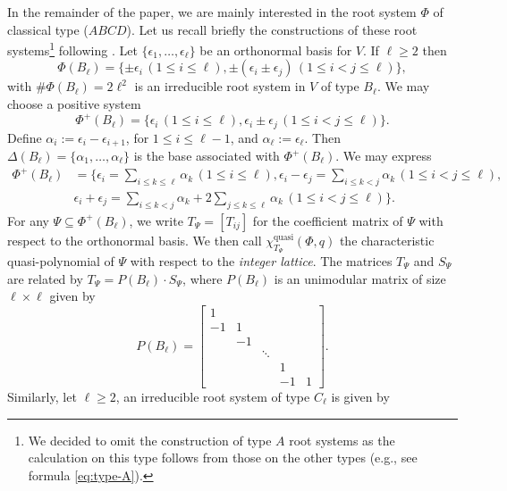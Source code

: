 \documentclass[12pt]{amsart}
\theoremstyle{plain}
\theoremstyle{definition}
\theoremstyle{remark}
\newcommand{\quasi}{\operatorname{quasi}}
\begin{document}
In the remainder of the paper, we are mainly interested in the root system $\Phi$ of classical type ($ABCD$).
Let us recall briefly the constructions of these root systems\footnote{We decided to omit the construction of type $A$ root systems as the calculation on this type follows from those on the other types (e.g., see formula \eqref{eq:type-A}).} following \cite[Chapter VI, $\S$4]{B68}.
Let $\{\epsilon_1, \ldots, \epsilon_{\ell}\}$ be an orthonormal basis for $V$. 
If  $\ell \ge 2$ then
$$\Phi(B_\ell)  = \{\pm\epsilon_i \,(1 \le i  \le \ell),\pm(\epsilon_i \pm \epsilon_j)  \,(1 \le i < j \le \ell )\},$$
with $\#\Phi(B_\ell) =2\ell^2$ is an irreducible root system in $V$ of type $B_{\ell}$. 
We may choose a positive system
$$\Phi^+(B_\ell)  = \{\epsilon_i \,(1 \le i  \le \ell), \epsilon_i \pm \epsilon_j \,(1 \le i < j \le \ell )\}.$$
Define $\alpha_i := \epsilon_i - \epsilon_{i+1}$, for $1 \le i  \le \ell-1$, and $\alpha_{\ell} := \epsilon_{\ell}$. 
Then $\Delta(B_\ell)  = \{\alpha_1,\ldots, \alpha_{\ell}\}$ is the base associated with $\Phi^+(B_\ell) $. 
We may express
\begin{align*}
\Phi^+(B_\ell)  & =  \{ \epsilon_i=\sum_{i\le k \le \ell }\alpha_k \,(1 \le i \le \ell), \epsilon_i-\epsilon_j=\sum_{i\le k < j }\alpha_k \,(1 \le i <  j \le \ell), \\
& \epsilon_i+\epsilon_j=\sum_{i\le k<j }\alpha_k+2 \sum_{j\le k \le \ell }\alpha_k\,(1 \le i < j \le \ell) \}.
\end{align*}
For any $\Psi\subseteq\Phi^+(B_\ell)$, we write $T_\Psi = [T_{ij}]$ for the coefficient matrix of $\Psi$ with respect to the orthonormal basis. 
We then call $\chi^{\quasi}_{T_\Psi}(\Phi, q)$ the characteristic quasi-polynomial of $\Psi$ with respect to the \emph{integer lattice}.
The matrices $T_\Psi$ and $S_\Psi$ are related by $T_\Psi=P(B_\ell)\cdot S_\Psi$, where $P(B_\ell) $ is an unimodular matrix of size $\ell \times \ell$ given by
$$P(B_\ell) =\begin{bmatrix}
1 &   &   & &  \\
-1 & 1 &   &  & \\
  & -1 &   &  & \\
  &   & \ddots  &  & \\
    &   &  & 1 & \\
      &   &  & -1 & 1
\end{bmatrix}.$$
Similarly, let $\ell \ge 2$, an irreducible root system of type $C_{\ell}$ is given by
\end{document}
